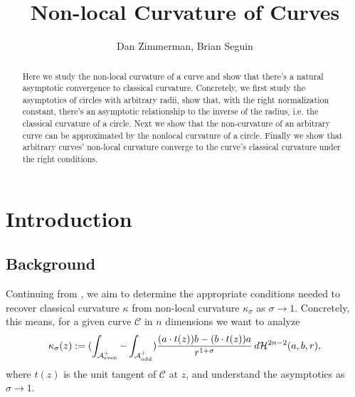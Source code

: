 \documentclass{article}
\newcommand{\aeven}{\mathcal{A}_{\mathrm{even}}^+}
\newcommand{\aodd}{\mathcal{A}_{\mathrm{odd}}^+}
\newcommand{\haus}[2]{\mathcal{H}^{#1}\parens{#2}}
\renewcommand{\dot}[2]{{#1}\cdot{#2}}
\newcommand{\pdot}[2]{\parens{\dot{#1}{#2}}}
\begin{document}
\title{\Huge Non-local Curvature of Curves}
\author{Dan Zimmerman, Brian Seguin}
\date{}
\setlength{\droptitle}{-6em}
\maketitle

\begin{abstract}
  Here we study the non-local curvature of a curve and show that there's a natural asymptotic convergence to classical curvature. Concretely, we first study the asymptotics of circles with arbitrary radii, show that, with the right normalization constant, there's an asymptotic relationship to the inverse of the radius, i.e. the classical curvature of a circle. Next we show that the non-curvature of an arbitrary curve can be approximated by the nonlocal curvature of a circle. Finally we show that arbitrary curves' non-local curvature converge to the curve's classical curvature under the right conditions.
\end{abstract}

\doublespacing
\tableofcontents
\singlespacing


\section{Introduction}%
\subsection{Background}%
Continuing from \cite{seguin:2020}, we aim to determine the appropriate conditions needed to recover classical curvature $\kappa$ from non-local curvature $\kappa_\sigma$ as $\sigma \to 1$. Concretely, this means, for a given curve $\mathcal{C}$ in $n$ dimensions we want to analyze
\begin{equation}
  \kappa_\sigma(z) := \parens{\int_{\aeven} - \int_{\aodd}} \frac{\pdot{a}{t(z)} b - \pdot{b}{t(z)}a}{r^{1+\sigma}} \, d\haus{2n-2}{a, b, r}, \label{def:non-local-curv}
\end{equation}
where $t(z)$ is the unit tangent of $\mathcal{C}$ at $z$, and understand the asymptotics as $\sigma \to 1$.
\end{document}
